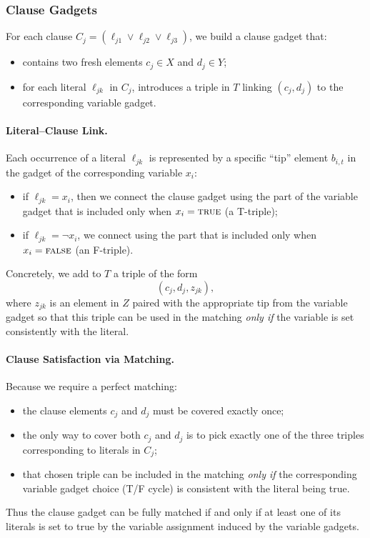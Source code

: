 \documentclass[9pt]{extarticle}
\begin{document}
\subsubsection*{Clause Gadgets}

For each clause \(C_j = (\ell_{j1} \lor \ell_{j2} \lor \ell_{j3})\), we build a
clause gadget that:
\begin{itemize}
    \item contains two fresh elements \(c_j \in X\) and \(d_j \in Y\);
    \item for each literal \(\ell_{jk}\) in \(C_j\), introduces a triple
          in \(T\) linking \((c_j, d_j)\) to the corresponding variable gadget.
\end{itemize}

\paragraph{Literal–Clause Link.}
Each occurrence of a literal \(\ell_{jk}\) is represented by a specific ``tip''
element \(b_{i,t}\) in the gadget of the corresponding variable \(x_i\):
\begin{itemize}
    \item if \(\ell_{jk} = x_i\), then we connect the clause gadget using the
          part of the variable gadget that is included only when
          \(x_i = \textsc{true}\) (a T-triple);
    \item if \(\ell_{jk} = \neg x_i\), we connect using the part that is
          included only when \(x_i = \textsc{false}\) (an F-triple).
\end{itemize}
Concretely, we add to \(T\) a triple of the form
\[
(c_j, d_j, z_{jk}),
\]
where \(z_{jk}\) is an element in \(Z\) paired with the appropriate tip from the
variable gadget so that this triple can be used in the matching \emph{only if}
the variable is set consistently with the literal.

\paragraph{Clause Satisfaction via Matching.}
Because we require a perfect matching:
\begin{itemize}
    \item the clause elements \(c_j\) and \(d_j\) must be covered exactly once;
    \item the only way to cover both \(c_j\) and \(d_j\) is to pick exactly
          one of the three triples corresponding to literals in \(C_j\);
    \item that chosen triple can be included in the matching \emph{only if} the
          corresponding variable gadget choice (T/F cycle) is consistent with
          the literal being true.
\end{itemize}
Thus the clause gadget can be fully matched if and only if at least one of its
literals is set to true by the variable assignment induced by the variable
gadgets.
\end{document}
